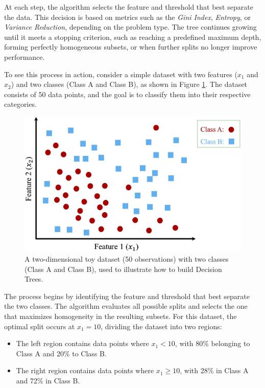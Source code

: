 \documentclass[
  11pt,
]{book}
\providecommand{\tightlist}{%
  \setlength{\itemsep}{0pt}\setlength{\parskip}{0pt}}
\theoremstyle{definition}
\theoremstyle{definition}
\theoremstyle{definition}
\theoremstyle{definition}
\theoremstyle{remark}
\begin{document}
At each step, the algorithm selects the feature and threshold that best separate the data. This decision is based on metrics such as the \emph{Gini Index}, \emph{Entropy}, or \emph{Variance Reduction}, depending on the problem type. The tree continues growing until it meets a stopping criterion, such as reaching a predefined maximum depth, forming perfectly homogeneous subsets, or when further splits no longer improve performance.

To see this process in action, consider a simple dataset with two features (\(x_1\) and \(x_2\)) and two classes (Class A and Class B), as shown in Figure \ref{fig:tree-1}. The dataset consists of 50 data points, and the goal is to classify them into their respective categories.

\begin{figure}[H]

{\centering \includegraphics[width=0.7\linewidth]{images/ch11_ex_tree_1} 

}

\caption{A two-dimensional toy dataset (50 observations) with two classes (Class A and Class B), used to illustrate how to build Decision Trees.}\label{fig:tree-1}
\end{figure}

The process begins by identifying the feature and threshold that best separate the two classes. The algorithm evaluates all possible splits and selects the one that maximizes homogeneity in the resulting subsets. For this dataset, the optimal split occurs at \(x_1 = 10\), dividing the dataset into two regions:

\begin{itemize}
\tightlist
\item
  The left region contains data points where \(x_1 < 10\), with 80\% belonging to Class A and 20\% to Class B.
\item
  The right region contains data points where \(x_1 \geq 10\), with 28\% in Class A and 72\% in Class B.
\end{itemize}
\end{document}
